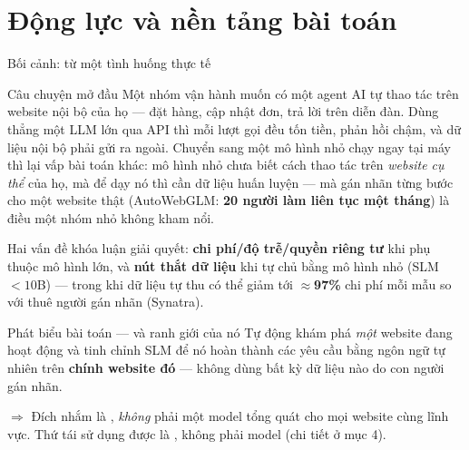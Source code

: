 
\section{Động lực và nền tảng bài toán}

\begin{frame}{Bối cảnh: từ một tình huống thực tế}
  \footnotesize
  \begin{alertblock}{Câu chuyện mở đầu}
    \footnotesize
    Một nhóm vận hành muốn có một agent AI tự thao tác trên website nội bộ của họ ---
    đặt hàng, cập nhật đơn, trả lời trên diễn đàn. Dùng thẳng một LLM lớn qua API thì
    mỗi lượt gọi đều tốn tiền, phản hồi chậm, và dữ liệu nội bộ phải gửi ra ngoài.
    Chuyển sang một mô hình nhỏ chạy ngay tại máy thì lại vấp bài toán khác: mô hình
    nhỏ chưa biết cách thao tác trên \emph{website cụ thể} của họ, mà để dạy nó thì cần
    dữ liệu huấn luyện --- mà gán nhãn từng bước cho một website thật (AutoWebGLM:
    \textbf{20 người làm liên tục một tháng}) là điều một nhóm nhỏ không kham nổi.
  \end{alertblock}

  \vspace{0.05cm}
  Hai vấn đề khóa luận giải quyết: \textbf{chi phí/độ trễ/quyền riêng tư} khi phụ thuộc
  mô hình lớn, và \textbf{nút thắt dữ liệu} khi tự chủ bằng mô hình nhỏ (SLM ${<}10$B)
  --- trong khi dữ liệu tự thu có thể giảm tới $\approx$\textbf{97\%} chi phí mỗi mẫu
  so với thuê người gán nhãn (Synatra).

  \vspace{0.05cm}
  \begin{block}{Phát biểu bài toán --- và ranh giới của nó}
    \footnotesize
    Tự động khám phá \emph{một} website đang hoạt động và tinh chỉnh SLM để nó hoàn
    thành các yêu cầu bằng ngôn ngữ tự nhiên trên \textbf{chính website đó} --- không
    dùng bất kỳ dữ liệu nào do con người gán nhãn.

    \vspace{0.06cm}
    {\scriptsize $\Rightarrow$ Đích nhắm là ,
    \emph{không} phải một model tổng quát cho mọi website cùng lĩnh vực. Thứ tái sử
    dụng được là , không phải model (chi tiết ở mục 4).}
  \end{block}
\end{frame}

